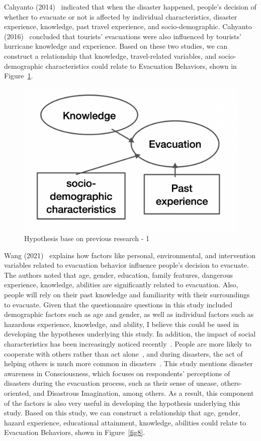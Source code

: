 Cahyanto (2014)~\cite{ref19} indicated that when the disaster happened, people's decision of whether to evacuate or not is affected by individual characteristics, disaster experience, knowledge, past travel experience, and socio-demographic. Cahyanto (2016)~\cite{Cahyanto2016StatedPO} concluded that tourists' evacuations were also influenced by tourists' hurricane knowledge and experience. Based on these two studies, we can construct a relationship that knowledge, travel-related variables, and socio-demographic characteristics could relate to Evacuation Behaviors, shown in Figure~\ref{fig7}. 


\begin{figure}[h]
  \includegraphics[width=0.5\linewidth]{Figure/Figure7.png}
  \centering
  \caption{Hypothesis base on previous research - 1 }
  \label{fig7}
\end{figure}

Wang (2021)~\cite{ref9} explains how factors like personal, environmental, and intervention variables related to evacuation behavior influence people's decision to evacuate. The authors noted that age, gender, education, family features, dangerous experience, knowledge, abilities are significantly related to evacuation. Also, people will rely on their past knowledge and familiarity with their surroundings to evacuate. Given that the questionnaire questions in this study included demographic factors such as age and gender, as well as individual factors such as hazardous experience, knowledge, and ability, I believe this could be used in developing the hypotheses underlying this study. In addition, the impact of social characteristics has been increasingly noticed recently~\cite{ref10}. People are more likely to cooperate with others rather than act alone~\cite{ref11}, and during disasters, the act of helping others is much more common in disasters~\cite{ref12}. This study mentions disaster awareness in Consciousness, which focuses on respondents' perceptions of disasters during the evacuation process, such as their sense of unease, others-oriented, and Disastrous Imagination, among others. As a result, this component of the factors is also very useful in developing the hypothesis underlying this study. Based on this study, we can construct a relationship that age, gender, hazard experience,  educational attainment, knowledge, abilities could relate to Evacuation Behaviors, shown in Figure~\ref{fig8}. 

